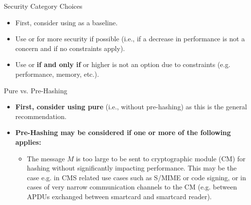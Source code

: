\begin{minipage}[t]{0.28\textwidth}
    \vspace{0pt}
    \begin{algorithmbox}{Security Category Choices}
        \scriptsize
        \begin{itemize}[leftmargin=*]
            \setlength\itemsep{0em}
            \item First, consider using \hspace{-3mm} as a baseline.\\
            \item Use \hspace{-3mm} or
            \hspace{-3mm} for more security if possible (i.e., if a decrease in performance is not a concern and if no constraints apply).\\
            \item Use \hspace{-3mm} or
            \hspace{-3mm} {\bfseries if and only if} \hspace{-3mm} or higher is not an option due to constraints (e.g. performance, memory, etc.).\\[\baselineskip]
        \end{itemize}
    \end{algorithmbox}
    \begin{algorithmbox}{Pure vs. Pre-Hashing}
        \scriptsize
        \begin{itemize}[leftmargin=*]
            \setlength\itemsep{0em}
            \item {\bfseries First, consider using  pure} (i.e., without pre-hashing) as this is the general recommendation.\\
            \item {\bfseries Pre-Hashing may be considered if one or more of the following applies:}
            \begin{itemize}[leftmargin=*]
                \setlength\itemsep{0em}
                \item The message $M$ is too large to be sent to cryptographic module (CM) for hashing without significantly impacting performance. This may be the case e.g. in CMS related use cases such as S/MIME or code signing, or in cases of very narrow communication channels to the CM (e.g. between APDUs exchanged between smartcard and smartcard reader).

\end{itemize}
\end{itemize}
\end{algorithmbox}
\end{minipage}
